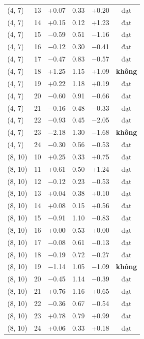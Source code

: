 \begin{longtable}{lrrrrc}
(4, 7) & 13 & +0.07 & 0.33 & +0.20 & đạt \\
(4, 7) & 14 & +0.15 & 0.12 & +1.23 & đạt \\
(4, 7) & 15 & $-$0.59 & 0.51 & $-$1.16 & đạt \\
(4, 7) & 16 & $-$0.12 & 0.30 & $-$0.41 & đạt \\
(4, 7) & 17 & $-$0.47 & 0.83 & $-$0.57 & đạt \\
(4, 7) & 18 & +1.25 & 1.15 & +1.09 & \textbf{không} \\
(4, 7) & 19 & +0.22 & 1.18 & +0.19 & đạt \\
(4, 7) & 20 & $-$0.60 & 0.91 & $-$0.66 & đạt \\
(4, 7) & 21 & $-$0.16 & 0.48 & $-$0.33 & đạt \\
(4, 7) & 22 & $-$0.93 & 0.45 & $-$2.05 & đạt \\
(4, 7) & 23 & $-$2.18 & 1.30 & $-$1.68 & \textbf{không} \\
(4, 7) & 24 & $-$0.30 & 0.56 & $-$0.53 & đạt \\
(8, 10) & 10 & +0.25 & 0.33 & +0.75 & đạt \\
(8, 10) & 11 & +0.61 & 0.50 & +1.24 & đạt \\
(8, 10) & 12 & $-$0.12 & 0.23 & $-$0.53 & đạt \\
(8, 10) & 13 & +0.04 & 0.38 & +0.10 & đạt \\
(8, 10) & 14 & +0.08 & 0.15 & +0.56 & đạt \\
(8, 10) & 15 & $-$0.91 & 1.10 & $-$0.83 & đạt \\
(8, 10) & 16 & +0.00 & 0.53 & +0.00 & đạt \\
(8, 10) & 17 & $-$0.08 & 0.61 & $-$0.13 & đạt \\
(8, 10) & 18 & $-$0.19 & 0.72 & $-$0.27 & đạt \\
(8, 10) & 19 & $-$1.14 & 1.05 & $-$1.09 & \textbf{không} \\
(8, 10) & 20 & $-$0.45 & 1.14 & $-$0.39 & đạt \\
(8, 10) & 21 & +0.76 & 1.16 & +0.65 & đạt \\
(8, 10) & 22 & $-$0.36 & 0.67 & $-$0.54 & đạt \\
(8, 10) & 23 & +0.78 & 0.79 & +0.99 & đạt \\
(8, 10) & 24 & +0.06 & 0.33 & +0.18 & đạt \\
\end{longtable}
